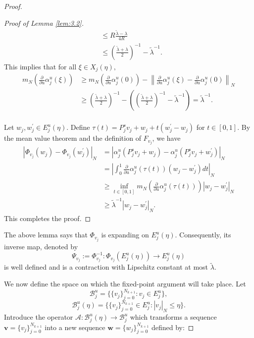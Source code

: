 \documentclass[12pt]{article}
\begin{document}
\begin{proof}
\begin{proof}[Proof of Lemma \ref{lem:3.2}]
\begin{equation}
\begin{aligned}
				&\leqslant R \frac{\widetilde\lambda-\lambda}{4R}\\
				&\leqslant (\frac{{\widetilde{\lambda}+\lambda}}{2}) ^{-1}-\tilde\lambda^{-1}.
			\end{aligned}
			\nonumber
		\end{equation}
		This implies that for all $ \xi \in X_{j}(\eta),$
		\begin{equation}
			\begin{aligned}
				m_N\left(\frac{\partial}{\partial u} \alpha_j^u(\xi)\right)
				&\geqslant m_N\left(\frac{\partial}{\partial u} \alpha_j^u(0)\right)- \left\|\frac{\partial}{\partial u} \alpha_j^u(\xi)- \frac{\partial}{\partial u} \alpha_j^u(0) \right\|_N \\
				&\geqslant (\frac{{\widetilde{\lambda}+\lambda}}{2}) ^{-1}-((\frac{{\widetilde{\lambda}+\lambda}}{2}) ^{-1}-\widetilde\lambda^{-1})= \widetilde\lambda^{-1}.\\
			\end{aligned}
			\nonumber
		\end{equation}
		
		Let $ w_{j},w_{j}^{'}\in E_{j}^{u}(\eta) $. Define  $ \tau(t)=P_{j}^{s}v_{j}+w_{j}+t(w_{j}^{'}-w_{j}) $ for $ t\in[0,1] $. By the mean value theorem and the definition of $ F_{v_{j}} $, we have
		\begin{equation}
			\begin{aligned}
				|\Phi_{v_{j}}(w_{j})-\Phi_{v_{j}}(w_{j}^{'})|_{N}
				&=|\alpha_{j}^{u}(P_{j}^{s}v_{j}+w_{j})-\alpha_{j}^{u}(P_{j}^{s}v_{j}+w_{j}^{'})|_{N} \\
				&=|\int_{0}^{1}\frac{\partial}{\partial u}\alpha_{j}^{u}(\tau(t))(w_{j}-w_{j}^{'})dt|_{N}\\
				&\geqslant \underset{t\in [0,1]}{\inf}m_{N}(\frac{\partial}{\partial u}\alpha_{j}^{u}(\tau(t)))|w_{j}-w_{j}^{'}|_{N}\\
				&\geqslant \widetilde\lambda^{-1}|w_{j}-w_{j}^{'}|_{N}.
			\end{aligned}
			\nonumber
		\end{equation}
		This completes the proof.
	\end{proof}
	The above lemma says that $\Phi_{v_{j}} $ is expanding on $ E_{j}^{u}(\eta) $. Consequently, its inverse map, denoted by
	$$
	\Psi_{v_{j}}:=\Phi_{v_{j}}^{-1}:\Phi_{v_{j}}(E_{j}^{u}(\eta))\rightarrow E_{j}^{u}(\eta)
	$$
	is well defined and is a contraction with Lipschitz constant at most $ \widetilde\lambda .$
	
	We now define the space on which the fixed-point argument will take place. Let
	$$
	\mathcal{B}_{j}^{u}=\{\{v_{j}\}_{j=0}^{N_{k+1}}:v_{j}\in E_{j}^{u}\},  
	$$
	$$
	\mathcal{B}_{j}^{u}(\eta)=\{\{v_{j}\}_{j=0}^{N_{k+1}}\in E_{j}^{u}:|v_{j}|_{N}\leqslant\eta\}.
	$$
	Introduce the operator $ \mathcal{A}:\mathcal{B}_{j}^{u}(\eta) \rightarrow\mathcal{B}_{j}^{u} $ which transforms a sequence $ \boldsymbol{v}=\{v_{j}\}_{j=0}^{N_{k+1}} $ into a new sequence $ \boldsymbol{w}=\{w_{j}\}_{j=0}^{N_{k+1}} $ defined by:
	

\end{proof}
\end{document}
